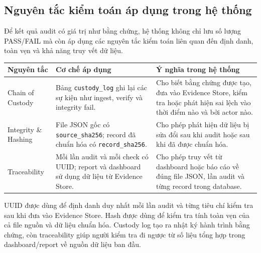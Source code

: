 \subsection{Nguyên tắc kiểm toán áp dụng trong hệ thống}\label{nguyen-tac-kiem-toan-ap-dung-trong-he-thong}

Để kết quả audit có giá trị như bằng chứng, hệ thống không chỉ lưu số lượng PASS/FAIL mà còn áp dụng các nguyên tắc kiểm toán liên quan đến định danh, toàn vẹn và khả năng truy vết dữ liệu.

{\def\LTcaptype{none}
\begin{center}
\label{tab:nguyen-tac-kiem-toan}
\end{center}
\begin{longtable}[]{@{}|
  >{\raggedright\arraybackslash}p{}|
  >{\raggedright\arraybackslash}p{}|
  >{\raggedright\arraybackslash}p{}|@{}}
\hline
\textbf{Nguyên tắc} & \textbf{Cơ chế áp dụng} & \textbf{Ý nghĩa trong hệ thống} \\
\hline
\endhead
Chain of Custody & Bảng \texttt{custody\_log} ghi lại các sự kiện như ingest, verify và integrity fail. & Cho biết bằng chứng được tạo, đưa vào Evidence Store, kiểm tra hoặc phát hiện sai lệch vào thời điểm nào và bởi actor nào. \\
\hline
Integrity \& Hashing & File JSON gốc có \texttt{source\_sha256}; record đã chuẩn hóa có \texttt{record\_sha256}. & Cho phép phát hiện dữ liệu bị sửa đổi sau khi audit hoặc sau khi đã được chuẩn hóa. \\
\hline
Traceability & Mỗi lần audit và mỗi check có UUID; report và dashboard sử dụng dữ liệu từ Evidence Store. & Cho phép truy vết từ dashboard hoặc báo cáo về đúng file JSON, lần audit và từng record trong database. \\
\hline
\end{longtable}
}

UUID được dùng để định danh duy nhất mỗi lần audit và từng tiêu chí kiểm tra sau khi đưa vào Evidence Store. Hash được dùng để kiểm tra tính toàn vẹn của cả file nguồn và dữ liệu chuẩn hóa. Custody log tạo ra nhật ký hành trình bằng chứng, còn traceability giúp người kiểm tra đi ngược từ số liệu tổng hợp trong dashboard/report về nguồn dữ liệu ban đầu.
